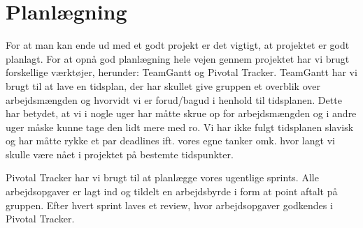 \clearpage
\section{Planlægning}
For at man kan ende ud med et godt projekt er det vigtigt, at projektet er godt planlagt. For at opnå god planlægning hele vejen gennem projektet har vi brugt forskellige værktøjer, herunder: TeamGantt og Pivotal Tracker. TeamGantt har vi brugt til at lave en tidsplan, der har skullet give gruppen et overblik over arbejdsmængden og hvorvidt vi er forud/bagud i henhold til tidsplanen. Dette har betydet, at vi i nogle uger har måtte skrue op for arbejdsmængden og i andre uger måske kunne tage den lidt mere med ro. Vi har ikke fulgt tidsplanen slavisk og har måtte rykke et par deadlines ift. vores egne tanker omk. hvor langt vi skulle være nået i projektet på bestemte tidspunkter.

Pivotal Tracker har vi brugt til at planlægge vores ugentlige sprints. Alle arbejdsopgaver er lagt ind og tildelt en arbejdsbyrde i form at point aftalt på gruppen. Efter hvert sprint laves et review, hvor arbejdsopgaver godkendes i Pivotal Tracker. 

\vspace{0.3 cm}
